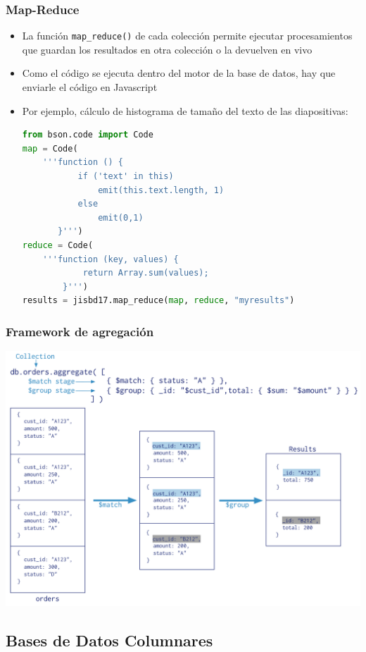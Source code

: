 \documentclass[14pt]{beamer}
\begin{document}
\begin{frame}
  \frametitle{Map-Reduce}
  \begin{itemize}
  \item La función {\tt map\_reduce()} de cada colección permite ejecutar
    procesamientos que guardan los resultados en otra colección o la
    devuelven en vivo
  \item Como el código se ejecuta dentro del motor de la base de datos, hay
    que enviarle el código en Javascript
  \item Por ejemplo, cálculo de histograma de tamaño del texto de las
    diapositivas:
\framebreak
\begin{lstlisting}[language=Python]
from bson.code import Code
map = Code(
    '''function () {
           if ('text' in this)
               emit(this.text.length, 1)
           else
               emit(0,1)
       }''')
reduce = Code(
    '''function (key, values) {
            return Array.sum(values);
        }''')
results = jisbd17.map_reduce(map, reduce, "myresults")
\end{lstlisting}

  \end{itemize}
\end{frame}


\begin{frame}
  \frametitle{Framework de agregación}
  \centering\includegraphics[height=.85\textheight]{img/mongo-aggregation}
\end{frame}


\subsection{Bases de Datos Columnares}
\end{document}
